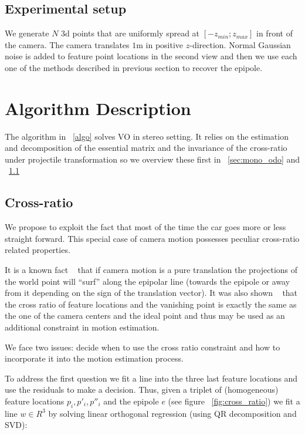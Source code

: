 \documentclass[10pt]{article}         %
\begin{document}
\subsection{Experimental setup}

We generate $N$ 3d points that are uniformly spread at
$[-z_{min};z_{max}]$ in front of the camera.  The camera translates
$1$m in positive $z$-direction.  Normal Gaussian noise is added to
feature point locations in the second view and then we use each one of
the methods described in previous section to recover the epipole.

\section{Algorithm Description}

The algorithm in ~\ref{algo} solves VO in stereo setting. It relies on
the estimation and decomposition of the essential matrix and the
invariance of the cross-ratio under projectile transformation so we
overview these first in ~\ref{sec:mono_odo} and ~\ref{sec:cross_ratio}


\subsection{Cross-ratio}\label{sec:cross_ratio}

We propose to exploit the fact that most of the time the car goes more
or less straight forward.  This special case of camera motion
possesses peculiar cross-ratio related properties.

It is a known fact ~\cite{Hartley2004} that if camera motion is a pure
translation the projections of the world point will ``surf'' along the
epipolar line (towards the epipole or away from it depending on the
sign of the translation vector). It was also shown
~\cite{basri1999visual} that the cross ratio of feature locations and
the vanishing point is exactly the same as the one of the camera
centers and the ideal point and thus may be used as an additional
constraint in motion estimation.

We face two issues: decide when to use the cross ratio constraint and
how to incorporate it into the motion estimation process.

To address the first question we fit a line into the three last
feature locations and use the residuals to make a decision.  Thus,
given a triplet of (homogeneous) feature locations $p_i,p'_i,p''_i$ and the epipole
$e$ (see figure ~\ref{fig:cross_ratio}) we fit a line $w\in R^3$ by solving linear orthogonal regression (using QR decomposition and SVD):
\end{document}
